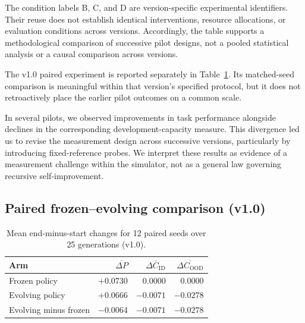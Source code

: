 \documentclass[11pt,a4paper]{article}
\newcommand{\id}{\mathrm{ID}}
\newcommand{\ood}{\mathrm{OOD}}
\begin{document}
The condition labels B, C, and D are version-specific experimental identifiers. Their reuse does not establish identical interventions, resource allocations, or evaluation conditions across versions.
Accordingly, the table supports a methodological comparison of successive pilot designs, not a pooled statistical analysis or a causal comparison across versions.

The v1.0 paired experiment is reported separately in Table~\ref{tab:v10}. Its matched-seed comparison is meaningful within that version's specified protocol, but it does not retroactively place the
earlier pilot outcomes on a common scale.

In several pilots, we observed improvements in task performance alongside declines in the corresponding
development-capacity measure. This divergence led us to revise the measurement design across successive
versions, particularly by introducing fixed-reference probes. We interpret these results as evidence of a measurement challenge within the simulator, not as a general law governing recursive self-improvement.

\subsection{Paired frozen--evolving comparison (v1.0)}
\begin{table}[htbp]\centering
\begin{tabular}{@{}lrrr@{}}\toprule
Arm & $\overline{\Delta P}$ & $\overline{\Delta C_{\id}}$ & $\overline{\Delta C_{\ood}}$ \\\midrule
Frozen policy & $+0.0730$ & $0.0000$ & $0.0000$ \\
Evolving policy & $+0.0666$ & $-0.0071$ & $-0.0278$ \\
Evolving minus frozen & $-0.0064$ & $-0.0071$ & $-0.0278$ \\\bottomrule
\end{tabular}\caption{Mean end-minus-start changes for 12 paired seeds over 25 generations (v1.0).}\label{tab:v10}
\end{table}
\end{document}
